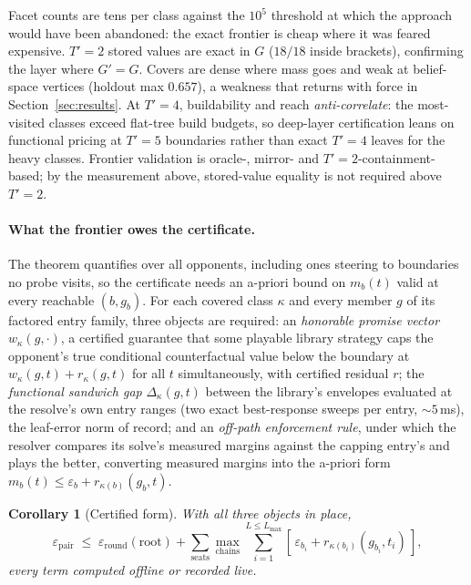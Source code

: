 \documentclass[11pt]{article}
\theoremstyle{plain}
\newtheorem{corollary}[theorem]{Corollary}
\theoremstyle{definition}
\theoremstyle{remark}
\newcommand{\game}{\ensuremath{G}}
\newcommand{\gp}{\ensuremath{G'}}
\newcommand{\pathmax}[1]{\max_{#1}}
\begin{document}
Facet counts are tens per class against the $10^{5}$ threshold at
which the approach would have been abandoned: the exact frontier is
cheap where it was feared expensive. $T'{=}2$ stored values are exact
in $\game$ ($18/18$ inside brackets), confirming the layer where
$\gp=\game$. Covers are dense where mass goes and weak at belief-space
vertices (holdout max $0.657$), a weakness that returns with force in
Section~\ref{sec:results}. At $T'{=}4$, buildability and reach
\emph{anti-correlate}: the most-visited classes exceed flat-tree build
budgets, so deep-layer certification leans on functional pricing at
$T'{=}5$ boundaries rather than exact $T'{=}4$ leaves for the heavy
classes. Frontier validation is oracle-, mirror- and
$T'{=}2$-containment-based; by the measurement above, stored-value
equality is not required above $T'{=}2$.

\paragraph{What the frontier owes the certificate.} The theorem
quantifies over all opponents, including ones steering to boundaries
no probe visits, so the certificate needs an a-priori bound on
$m_b(t)$ valid at every reachable $(b,g_b)$. For each covered class
$\kappa$ and every member $g$ of its factored entry family, three
objects are required: an \emph{honorable promise vector}
$w_\kappa(g,\cdot)$, a certified guarantee that some playable library
strategy caps the opponent's true conditional counterfactual value
below the boundary at $w_\kappa(g,t)+r_\kappa(g,t)$ for all $t$
simultaneously, with certified residual $r$; the \emph{functional
sandwich gap} $\Delta_\kappa(g,t)$ between the library's envelopes
evaluated at the resolve's own entry ranges (two exact best-response
sweeps per entry, ${\sim}5$\,ms), the leaf-error norm of record; and
an \emph{off-path enforcement rule}, under which the resolver compares
its solve's measured margins against the capping entry's and plays the
better, converting measured margins into the a-priori form
$m_b(t)\le\varepsilon_b+r_{\kappa(b)}(g_b,t)$.

\begin{corollary}[Certified form]\label{cor:cert}
With all three objects in place,
\[
\varepsilon_{\mathrm{pair}} \;\le\;
\varepsilon_{\mathrm{round}}(\mathrm{root}) +
\sum_{\mathrm{seats}}\pathmax{\mathrm{chains}}
\sum_{i=1}^{L\le L_{\max}}
[\,\varepsilon_{b_i} + r_{\kappa(b_i)}(g_{b_i},t_i)\,],
\]
every term computed offline or recorded live.
\end{corollary}
\end{document}
